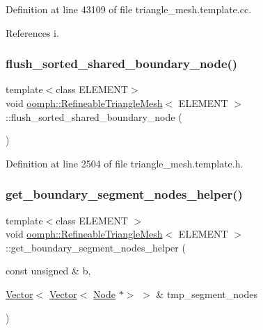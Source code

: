Definition at line 43109 of file triangle\+\_\+mesh.\+template.\+cc.



References i.

\mbox{\label{classoomph_1_1RefineableTriangleMesh_ad217a5617c922036481ded0de5e40aec}} 
\subsubsection{\texorpdfstring{flush\+\_\+sorted\+\_\+shared\+\_\+boundary\+\_\+node()}{flush\_sorted\_shared\_boundary\_node()}}
{\footnotesize\ttfamily template$<$class E\+L\+E\+M\+E\+NT$>$ \\
void \hyperlink{classoomph_1_1RefineableTriangleMesh}{oomph\+::\+Refineable\+Triangle\+Mesh}$<$ E\+L\+E\+M\+E\+NT $>$\+::flush\+\_\+sorted\+\_\+shared\+\_\+boundary\+\_\+node (\begin{DoxyParamCaption}{ }\end{DoxyParamCaption})\hspace{0.3cm}{\ttfamily [inline]}}



Definition at line 2504 of file triangle\+\_\+mesh.\+template.\+h.

\mbox{\label{classoomph_1_1RefineableTriangleMesh_aad6d4838c8e0e61359ad48f10a01bacd}} 
\subsubsection{\texorpdfstring{get\+\_\+boundary\+\_\+segment\+\_\+nodes\+\_\+helper()}{get\_boundary\_segment\_nodes\_helper()}}
{\footnotesize\ttfamily template$<$class E\+L\+E\+M\+E\+NT $>$ \\
void \hyperlink{classoomph_1_1RefineableTriangleMesh}{oomph\+::\+Refineable\+Triangle\+Mesh}$<$ E\+L\+E\+M\+E\+NT $>$\+::get\+\_\+boundary\+\_\+segment\+\_\+nodes\+\_\+helper (\begin{DoxyParamCaption}\item[{const unsigned \&}]{b,  }\item[{\hyperlink{classoomph_1_1Vector}{Vector}$<$ \hyperlink{classoomph_1_1Vector}{Vector}$<$ \hyperlink{classoomph_1_1Node}{Node} $\ast$$>$ $>$ \&}]{tmp\+\_\+segment\+\_\+nodes }\end{DoxyParamCaption})}



